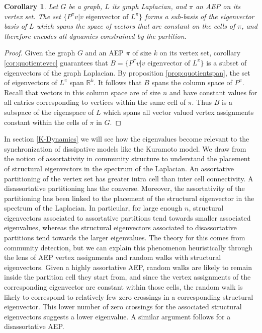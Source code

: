 \documentclass[%
 aip,
 amsmath,amssymb,
preprint,
reprint, onecolumn %
]{revtex4-1}
\newcommand{\R}{\mathbb{R}}
\newtheorem{cor}[theorem]{Corollary}
\begin{document}
\begin{cor}\label{Cor:SubBasis}
    Let $G$ be a graph, $L$ its graph Laplacian, and $\pi$ an AEP on its vertex set. The set $\{P^\pi v | v \text{ eigenvector of $L^\pi$}\}$ forms a sub-basis of the eigenvector basis of $L$ which spans the space of vectors that are constant on the cells of $\pi$, and therefore encodes all dynamics constrained by the partition.
\end{cor}
\begin{proof}
    Given the graph $G$ and an AEP $\pi$ of size $k$ on its vertex set, corollary \ref{cor:quotientevec} guarantees that $B = \{P^\pi v | v \text{ eigenvector of $L^\pi$}\}$ is a subset of eigenvectors of the graph Laplacian. By proposition \ref{prop:quotientspan}, the set of eigenvectors of $L^\pi$ span $\R^k$. It follows that $B$ spans the column space of $P^\pi$. Recall that vectors in this column space are of size $n$ and have constant values for all entries corresponding to vertices within the same cell of $\pi$. Thus $B$ is a subspace of the eigenspace of $L$ which spans all vector valued vertex assignments constant within the cells of $\pi$ in $G$.
\end{proof}

In section \ref{K-Dynamics} we will see how the eigenvalues become relevant to the synchronization of dissipative models like the Kuramoto model. We draw from the notion of assortativity in community structure to understand the placement of structural eigenvectors in the spectrum of the Laplacian. An assortative partitioning of the vertex set has greater intra cell than inter cell connectivity. A disassortative partitioning has the converse. Moreover, the assortativity of the partitioning has been linked to the placement of the structural eigenvector in the spectrum of the Laplacian.\cite{krzakala_spectral_2013} In particular, for large enough $n$, structural eigenvectors associated to assortative partitions tend towards smaller associated eigenvalues, whereas the structural eigenvectors associated to disassortative partitions tend towards the larger eigenvalues. The theory for this comes from community detection,\cite{saade_spectral_nodate} but we can explain this phenomenon heuristically through the lens of AEP vertex assignments and random walks with structural eigenvectors. Given a highly assortative AEP, random walks are likely to remain inside the partition cell they start from, and since the vertex assignments of the corresponding eigenvector are constant within those cells, the random walk is likely to correspond to relatively few zero crossings in a corresponding structural eigenvector. This lower number of zero crossings for the associated structural eigenvectors suggests a lower eigenvalue. A similar argument follows for a disassortative AEP. 
\end{document}
